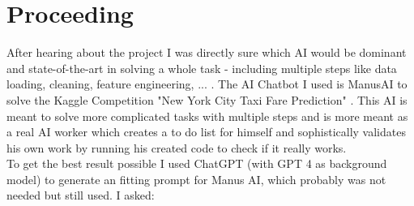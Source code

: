 \documentclass[fontsize=11pt, paper=a4, pagesize=auto]{scrreprt}
\begin{document}
\maketitle
\tableofcontents

\cleardoublepage
{}

\chapter{Proceeding}
\label{cha:proceedings}
	After hearing about the project I was directly sure which AI would be dominant and state-of-the-art in solving a whole task - including multiple steps like data loading, cleaning, feature engineering, ... . The AI Chatbot I used is ManusAI to solve the Kaggle Competition "New York City Taxi Fare Prediction" \cite{shen2025mindmachinerisemanus}\cite{ManusAI}. This AI is meant to solve more complicated tasks with multiple steps and is more meant as a real AI worker which creates a to do list for himself and sophistically validates his own work by running his created code to check if it really works.\\
	To get the best result possible I used ChatGPT (with GPT 4 as background model) to generate an fitting prompt for Manus AI, which probably was not needed but still used. I asked:
	\begin{center}
	\end{center}
	
\end{document}
